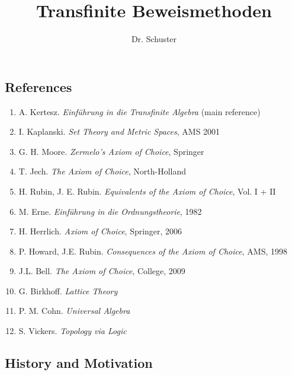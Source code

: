 \documentclass[headsepline=true,DIV=11]{scrartcl}
\theoremstyle{definition}
\newenvironment{gelaber}{}{}
\newenvironment{preamble}{}{}
\begin{document}
\begin{preamble}
\subject{Vorlesung aus dem Sommersemester 2013}
\title{Transfinite Beweismethoden}
\author{Dr. Schuster}
\date{}

\maketitle
\end{preamble}

\setcounter{section}{0}


\subsection*{References}

\begin{gelaber}
	\begin{enumerate}
		\item A. Kertesz. {\em Einführung in die Transfinite Algebra} (main reference)
		\item I. Kaplanski. {\em Set Theory and Metric Spaces}, AMS 2001
		\item G. H. Moore. {\em Zermelo's Axiom of Choice}, Springer
		\item T. Jech. {\em The Axiom of Choice}, North-Holland
		\item H. Rubin, J. E. Rubin. {\em Equivalents of the Axiom of Choice},  Vol. I + II
		\item M. Erne. {\em Einführung in die Ordnungstheorie}, 1982
		\item H. Herrlich. {\em Axiom of Choice}, Springer, 2006
		\item P. Howard, J.E. Rubin. {\em Consequences of the Axiom of Choice}, AMS, 1998
		\item J.L. Bell. {\em The Axiom of Choice}, College, 2009
                \item G. Birkhoff. {\em Lattice Theory}
                \item P. M. Cohn. {\em Universal Algebra}
                \item S. Vickers. {\em Topology via Logic}
	\end{enumerate}
\end{gelaber}

\subsection*{History and Motivation}
\end{document}
